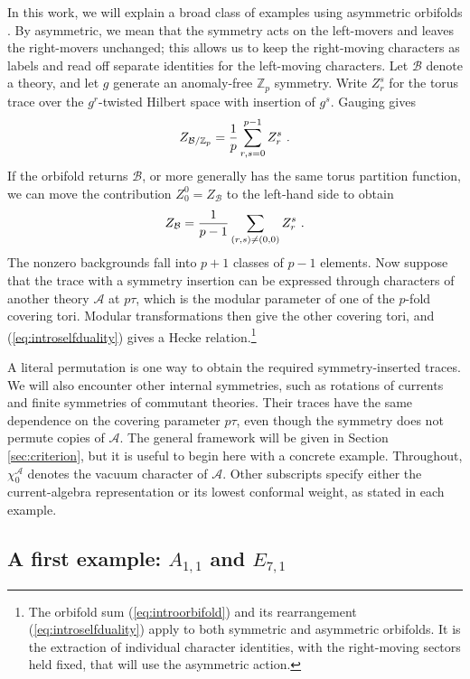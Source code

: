 \documentclass[12pt]{article}
\numberwithin{equation}{section}
\newcommand{\bea}{\begin{eqnarray}}
\newcommand{\eea}{\end{eqnarray}}
\def\ZZ{\mathbb{Z}}
\def\cA{\mathcal{A}}
\def\cB{\mathcal{B}}
\theoremstyle{remark}
\begin{document}
In this work, we will explain a broad class of examples using asymmetric orbifolds \cite{Narain:1986qm,Narain:1990mw}. By asymmetric, we mean that the symmetry acts on the left-movers and leaves the right-movers unchanged; this allows us to keep the right-moving characters as labels and read off separate identities for the left-moving characters. 
Let $\cB$ denote a theory, and let $g$ generate an anomaly-free $\ZZ_p$ symmetry. Write $Z^s_r$ for the torus trace over the $g^r$-twisted Hilbert space with insertion of $g^s$. Gauging gives
\bea \label{eq:introorbifold}
Z_{\cB/\ZZ_p}={1\over p}\sum_{r,s=0}^{p-1}Z^s_r~.
\eea
If the orbifold returns $\cB$, or more generally has the same torus partition function, we can move the contribution $Z^0_0=Z_{\cB}$ to the left-hand side to obtain
\bea \label{eq:introselfduality}
Z_{\cB}={1\over p-1}\sum_{(r,s)\ne(0,0)}Z^s_r~.
\eea
The nonzero backgrounds fall into $p+1$ classes of $p-1$ elements. Now suppose that the trace with a symmetry insertion can be expressed through characters of another theory $\cA$ at $p\tau$, which is the modular parameter of one of the $p$-fold covering tori. Modular transformations then give the other covering tori, and (\ref{eq:introselfduality}) gives a Hecke relation.\footnote{The orbifold sum (\ref{eq:introorbifold}) and its rearrangement (\ref{eq:introselfduality}) apply to both symmetric and asymmetric orbifolds. It is the extraction of individual character identities, with the right-moving sectors held fixed, that will use the asymmetric action.} 

 A literal permutation is one way to obtain the required symmetry-inserted traces. We will also encounter other internal symmetries, such as rotations of currents and finite symmetries of commutant theories. Their traces have the same dependence on the covering parameter $p\tau$, even though the symmetry does not permute copies of $\cA$.  The general framework will be given in Section \ref{sec:criterion}, but it is useful to begin here with a concrete example. Throughout, $\chi^{\cA}_0$ denotes the vacuum character of $\cA$. Other subscripts specify either the current-algebra representation or its lowest conformal weight, as stated in each example. 

\subsection{A first example: $A_{1,1}$ and $E_{7,1}$}
\end{document}
